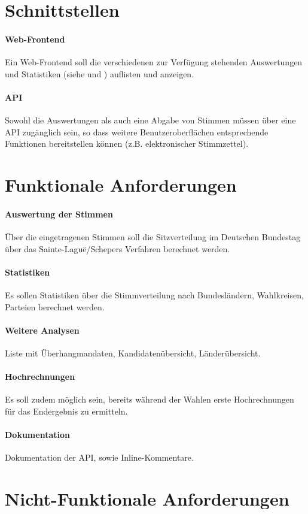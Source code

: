 \documentclass[11pt,a4paper]{scrartcl}
\begin{document}
\section{Schnittstellen}
\paragraph{Web-Frontend}
Ein Web-Frontend soll die verschiedenen zur Verfügung stehenden Auswertungen und Statistiken (siehe  und ) auflisten und anzeigen.
\paragraph{API}
Sowohl die Auswertungen als auch eine Abgabe von Stimmen müssen über eine API zugänglich sein, so dass weitere Benutzeroberflächen entsprechende Funktionen bereitstellen können (z.B. elektronischer Stimmzettel).
\section{Funktionale Anforderungen}
\paragraph{Auswertung der Stimmen}
\label{par:auswertung}
Über die eingetragenen Stimmen soll die Sitzverteilung im Deutschen Bundestag über das Sainte-Laguë/Schepers Verfahren berechnet werden.
\paragraph{Statistiken}
\label{par:statistiken}
Es sollen Statistiken über die Stimmverteilung nach Bundesländern, Wahlkreisen, Parteien berechnet werden.
\paragraph{Weitere Analysen}
Liste mit Überhangmandaten, Kandidatenübersicht, Länderübersicht.
\paragraph{Hochrechnungen}
Es soll zudem möglich sein, bereits während der Wahlen erste Hochrechnungen für das Endergebnis zu ermitteln.
\paragraph{Dokumentation}
Dokumentation der API, sowie Inline-Kommentare.
\section{Nicht-Funktionale Anforderungen}
\end{document}
